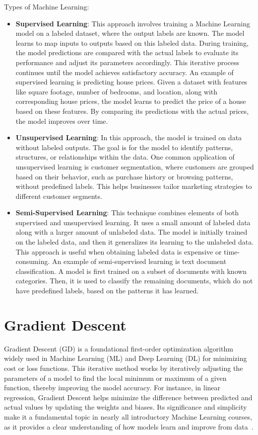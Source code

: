 \documentclass[12pt,a4paper]{report}
\begin{document}
Types of Machine Learning:
\begin{itemize}
  \item \textbf{Supervised Learning}: This approach involves training a Machine Learning model on a labeled dataset, where the output labels are known. The model learns to map inputs to outputs based on this labeled data. During training, the model predictions are compared with the actual labels to evaluate its performance and adjust its parameters accordingly. This iterative process continues until the model achieves satisfactory accuracy. An example of supervised learning is predicting house prices. Given a dataset with features like square footage, number of bedrooms, and location, along with corresponding house prices, the model learns to predict the price of a house based on these features. By comparing its predictions with the actual prices, the model improves over time.
  \item \textbf{Unsupervised Learning}: In this approach, the model is trained on data without labeled outputs. The goal is for the model to identify patterns, structures, or relationships within the data. One common application of unsupervised learning is customer segmentation, where customers are grouped based on their behavior, such as purchase history or browsing patterns, without predefined labels. This helps businesses tailor marketing strategies to different customer segments.
  \item \textbf{Semi-Supervised Learning}: This technique combines elements of both supervised and unsupervised learning. It uses a small amount of labeled data along with a larger amount of unlabeled data. The model is initially trained on the labeled data, and then it generalizes its learning to the unlabeled data. This approach is useful when obtaining labeled data is expensive or time-consuming. An example of semi-supervised learning is text document classification. A model is first trained on a subset of documents with known categories. Then, it is used to classify the remaining documents, which do not have predefined labels, based on the patterns it has learned.
\end{itemize}

\section{Gradient Descent}\vspace{-12pt}
Gradient Descent (GD) is a foundational first-order optimization algorithm widely used in Machine Learning (ML) and Deep Learning (DL) for minimizing cost or loss functions. This iterative method works by iteratively adjusting the parameters of a model to find the local minimum or maximum of a given function, thereby improving the model accuracy. For instance, in linear regression, Gradient Descent helps minimize the difference between predicted and actual values by updating the weights and biases. Its significance and simplicity make it a fundamental topic in nearly all introductory Machine Learning courses, as it provides a clear understanding of how models learn and improve from data~\cite{gradientdescent}.
\end{document}
